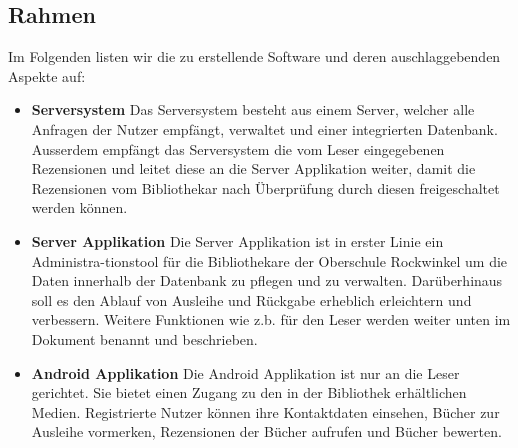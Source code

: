 \documentclass[fontsize=12pt,paper=a4,twoside]{scrartcl}
\begin{document}
\subsection{Rahmen} \label{subsec:Rahmen} Im Folgenden listen wir die zu erstellende Software und deren auschlaggebenden Aspekte auf: 
\begin{itemize}
	\item{\textbf{Serversystem}} Das Serversystem besteht aus einem Server, welcher alle Anfragen der Nutzer empfängt, verwaltet und einer integrierten Datenbank. Ausserdem empfängt das Serversystem die vom Leser eingegebenen Rezensionen und leitet diese an die Server Applikation weiter, damit die Rezensionen vom Bibliothekar nach Überprüfung durch diesen freigeschaltet werden können. 
	\item{\textbf{Server Applikation}} Die Server Applikation ist in erster Linie ein Administra-tionstool für die Bibliothekare der Oberschule Rockwinkel um die Daten innerhalb der Datenbank zu pflegen und zu verwalten. Darüberhinaus soll es den Ablauf von Ausleihe und Rückgabe erheblich erleichtern und verbessern. Weitere Funktionen wie z.b. für den Leser werden weiter unten im Dokument benannt und beschrieben. 
	\item{\textbf{Android Applikation}} Die Android Applikation ist nur an die Leser gerichtet. Sie bietet einen Zugang zu den in der Bibliothek erhältlichen Medien. Registrierte Nutzer können ihre Kontaktdaten einsehen, Bücher zur Ausleihe vormerken, Rezensionen der Bücher aufrufen und Bücher bewerten. 
\end{itemize}
\ 
\end{document}
